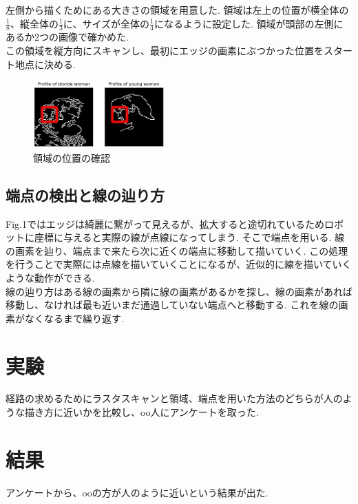 \documentclass[10pt]{jarticle}
\begin{document}
	左側から描くためにある大きさの領域を用意した.
	領域は左上の位置が横全体の$\frac{1}{8}$、縦全体の$\frac{1}{3}$に、サイズが全体の$\frac{1}{4}$になるように設定した.
	領域が頭部の左側にあるか2つの画像で確かめた.
	\\この領域を縦方向にスキャンし、最初にエッジの画素にぶつかった位置をスタート地点に決める.

    \begin{center}
        \begin{figure}[h]
            \includegraphics[width=0.45\textwidth]{img/003.png}
            \caption{領域の位置の確認}
            \label{the position of a region}
        \end{figure}
    \end{center}
	

	\subsection{端点の検出と線の辿り方}
	Fig.1ではエッジは綺麗に繋がって見えるが、拡大すると途切れているためロボットに座標に与えると実際の線が点線になってしまう.
	そこで端点を用いる.
	線の画素を辿り、端点まで来たら次に近くの端点に移動して描いていく.
	この処理を行うことで実際には点線を描いていくことになるが、近似的に線を描いていくような動作ができる.
  \\ 
	線の辿り方はある線の画素から隣に線の画素があるかを探し、線の画素があれば移動し、なければ最も近いまだ通過していない端点へと移動する.
	これを線の画素がなくなるまで繰り返す.
	


	\section{実験}

	経路の求めるためにラスタスキャンと領域、端点を用いた方法のどちらが人のような描き方に近いかを比較し、oo人にアンケートを取った.

	\section{結果}
	
	アンケートから、ooの方が人のように近いという結果が出た.
\end{document}
